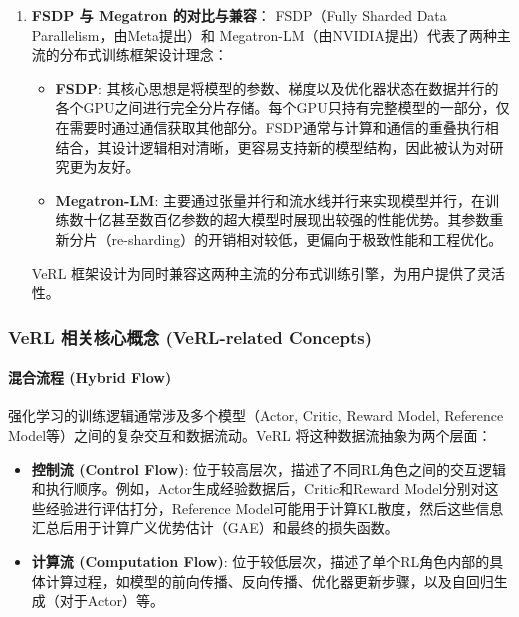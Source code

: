 \documentclass{article}
\begin{document}
\begin{enumerate}
    \item \textbf{FSDP 与 Megatron 的对比与兼容}：
    FSDP（Fully Sharded Data Parallelism，由Meta提出）和 Megatron-LM（由NVIDIA提出）代表了两种主流的分布式训练框架设计理念：
    \begin{itemize}
        \item \textbf{FSDP}: 其核心思想是将模型的参数、梯度以及优化器状态在数据并行的各个GPU之间进行完全分片存储。每个GPU只持有完整模型的一部分，仅在需要时通过通信获取其他部分。FSDP通常与计算和通信的重叠执行相结合，其设计逻辑相对清晰，更容易支持新的模型结构，因此被认为对研究更为友好。
        \item \textbf{Megatron-LM}: 主要通过张量并行和流水线并行来实现模型并行，在训练数十亿甚至数百亿参数的超大模型时展现出较强的性能优势。其参数重新分片（re-sharding）的开销相对较低，更偏向于极致性能和工程优化。
    \end{itemize}
    VeRL 框架设计为同时兼容这两种主流的分布式训练引擎，为用户提供了灵活性。
\end{enumerate}

\subsubsection{VeRL 相关核心概念 (VeRL-related Concepts)}

\paragraph{混合流程 (Hybrid Flow)}
强化学习的训练逻辑通常涉及多个模型（Actor, Critic, Reward Model, Reference Model等）之间的复杂交互和数据流动。VeRL 将这种数据流抽象为两个层面：
\begin{itemize}
    \item \textbf{控制流 (Control Flow)}: 位于较高层次，描述了不同RL角色之间的交互逻辑和执行顺序。例如，Actor生成经验数据后，Critic和Reward Model分别对这些经验进行评估打分，Reference Model可能用于计算KL散度，然后这些信息汇总后用于计算广义优势估计（GAE）和最终的损失函数。
    \item \textbf{计算流 (Computation Flow)}: 位于较低层次，描述了单个RL角色内部的具体计算过程，如模型的前向传播、反向传播、优化器更新步骤，以及自回归生成（对于Actor）等。
\end{itemize}
\end{document}
